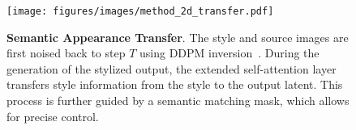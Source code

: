 \begin{figure}[t!]
\centering
\texttt{[image: figures/images/method\_2d\_transfer.pdf]}
\caption{\textbf{Semantic Appearance Transfer}. 
The style and source images are first noised back to step $T$ using DDPM inversion~\cite{huberman2024edit}. During the generation of the stylized output, the extended self-attention layer transfers style information from the style to the output latent. This process is further guided by a semantic matching mask, which allows for precise control.
} 
\label{fig:method_2d}
\end{figure}
